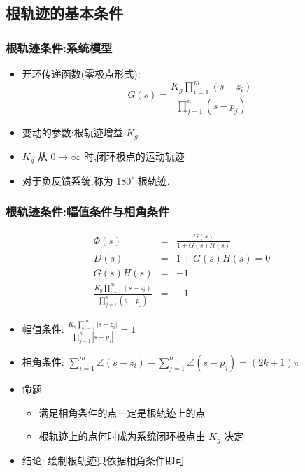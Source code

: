 \documentclass{article}
\begin{document}
\subsection{根轨迹的基本条件}
\label{sec-1-2}
\begin{frame}
\frametitle{根轨迹条件:系统模型}
\label{sec-1-2-1}



\begin{itemize}
\item <2-> 开环传递函数(零极点形式):  
          \[G(s)=\frac{K_g\prod_{i=1}^m(s-z_i)}{\prod_{j=1}^n(s-p_j)}\]
\item <3-> 变动的参数:根轨迹增益  $K_g$
\item <4-> $K_g$ 从  $0\rightarrow\infty$  时,闭环极点的运动轨迹
\item <5-> 对于负反馈系统,称为  $180^\circ$  根轨迹.
\end{itemize}
\end{frame}
\begin{frame}
\frametitle{根轨迹条件:幅值条件与相角条件}
\label{sec-1-2-2}


\begin{eqnarray*}
\Phi(s) &=& \frac{G(s)}{1+G(s)H(s)} \\
D(s) &= &1+G(s)H(s) 
     = 0 \\
G(s)H(s) &=& -1 \\
\frac{K_g\prod_{i=1}^m(s-z_i)}{\prod_{j=1}^n(s-p_j)} &=& -1 
\end{eqnarray*}

\begin{itemize}
\item <2->幅值条件:  $\frac{K_g\prod_{i=1}^m|s-z_i|}{\prod_{j=1}^n|s-p_j|} = 1$
\item <3->相角条件:  $\sum_{i=1}^m\angle (s-z_i)-\sum_{j=1}^n\angle (s-p_j) = (2k+1)\pi$
\item <4->命题
\begin{itemize}
\item <4->满足相角条件的点一定是根轨迹上的点
\item <5->根轨迹上的点何时成为系统闭环极点由  $K_g$  决定
\end{itemize}
\item <6->结论: 绘制根轨迹只依据相角条件即可
\end{itemize}
\end{frame}
\end{document}
